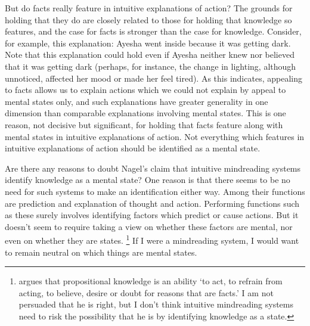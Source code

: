 \documentclass[11pt,a4paper]{extarticle}
\begin{document}
But do facts really feature in intuitive explanations of action?
The grounds for holding that they do are closely related to those for holding that knowledge so features, and the case for facts is stronger than the case for knowledge.
Consider, for example, this explanation: Ayesha went inside because it was getting dark.
Note that this explanation could hold even if Ayesha neither knew nor believed that it was getting dark (perhaps, for instance, the change in lighting, although unnoticed, affected her mood or made her feel tired).
As this indicates, appealing to facts allows us to explain actions which we could not explain by appeal to mental states only, and such explanations have greater generality in one dimension than comparable explanations involving mental states.
This is one reason, not decisive but significant, for holding that facts feature along with mental states in intuitive explanations of action.
Not everything which features in intuitive explanations of action should be identified as a mental state.



Are there any reasons to doubt  Nagel's claim that intuitive mindreading systems identify knowledge as a mental state?
One reason is that there seems to be no need for such systems to make an identification either way.
Among their functions are prediction and explanation of thought and action.
Performing functions such as these surely involves identifying factors which predict or cause actions. 
But it doesn't seem to require taking a view on whether these factors are mental, nor even on whether they are states.%
\footnote{
\citet[p.\ 451]{Hyman:1999fk} argues that propositional knowledge is an ability `to act, to refrain from acting, to believe, desire or doubt for reasons that are facts.' 
I am not persuaded that he is right, but I don't think intuitive mindreading systems need to risk the possibility that he is by identifying knowledge as a state.
}
If I were a mindreading system, I would want to remain neutral on which things are mental states.
\end{document}
